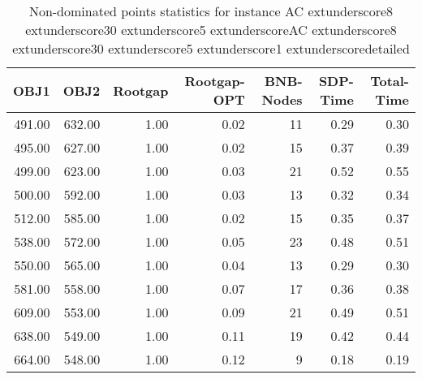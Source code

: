 \begin{table}
\caption{Non-dominated points statistics for instance AC	extunderscore8	extunderscore30	extunderscore5	extunderscoreAC	extunderscore8	extunderscore30	extunderscore5	extunderscore1	extunderscoredetailed}
\label{tab:stats/AC_8_30_5_AC_8_30_5_1_detailed}
\begin{tabular}{rrrrrrr}
\toprule
OBJ1 & OBJ2 & Rootgap & Rootgap-OPT & BNB-Nodes & SDP-Time & Total-Time \\
\midrule
491.00 & 632.00 & 1.00 & 0.02 & 11 & 0.29 & 0.30 \\
495.00 & 627.00 & 1.00 & 0.02 & 15 & 0.37 & 0.39 \\
499.00 & 623.00 & 1.00 & 0.03 & 21 & 0.52 & 0.55 \\
500.00 & 592.00 & 1.00 & 0.03 & 13 & 0.32 & 0.34 \\
512.00 & 585.00 & 1.00 & 0.02 & 15 & 0.35 & 0.37 \\
538.00 & 572.00 & 1.00 & 0.05 & 23 & 0.48 & 0.51 \\
550.00 & 565.00 & 1.00 & 0.04 & 13 & 0.29 & 0.30 \\
581.00 & 558.00 & 1.00 & 0.07 & 17 & 0.36 & 0.38 \\
609.00 & 553.00 & 1.00 & 0.09 & 21 & 0.49 & 0.51 \\
638.00 & 549.00 & 1.00 & 0.11 & 19 & 0.42 & 0.44 \\
664.00 & 548.00 & 1.00 & 0.12 & 9 & 0.18 & 0.19 \\
\bottomrule
\end{tabular}
\end{table}
